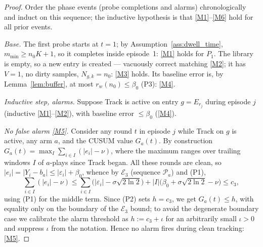 \documentclass[11pt]{article}
\newcommand{\Ecal}{\mathcal E}
\newcommand{\Pcal}{\mathcal P}
\begin{document}
\begin{proof}
Order the phase events (probe completions and alarms) chronologically and induct on this sequence; the inductive hypothesis is that \ref{M1}--\ref{M6} hold for all prior events.

\emph{Base.} The first probe starts at $t=1$; by Assumption~\ref{ass:dwell_time}, $m_{\min}\ge n_0K+1$, so it completes inside episode~1: \ref{M1} holds for $P_1$. The library is empty, so a new entry is created --- vacuously correct matching \ref{M2}; it has $V=1$, no dirty samples, $N_{g,k}=n_0$: \ref{M3} holds. Its baseline error is, by Lemma~\ref{lem:buffer}, at most $r_w(n_0)\le\beta_0$ (P3): \ref{M4}.

\emph{Inductive step, alarms.} Suppose Track is active on entry $g=E_{r_j}$ during episode $j$ (inductive \ref{M1}--\ref{M2}), with baseline error $\le\beta_0$ (\ref{M4}).

\emph{No false alarm \ref{M5}.} Consider any round $t$ in episode $j$ while Track on $g$ is active, any arm $a$, and the CUSUM value $G_a(t)$. By construction $G_a(t)=\max_{I}\sum_{i\in I}(|e_i|-\nu)$, where the maximum ranges over trailing windows $I$ of $a$-plays since Track began. All these rounds are clean, so $|e_i|=|Y_i-b_a|\le|\varepsilon_i|+\beta_0$, whence by $\Ecal_3$ (sequence $\Pcal_a$) and (P1),
\[
\sum_{i\in I}(|e_i|-\nu)
\le\sum_{i\in I}\bigl(|\varepsilon_i|-\sigma\sqrt{2\ln2}\bigr)
+|I|\bigl(\beta_0+\sigma\sqrt{2\ln2}-\nu\bigr)
\le c_3 ,
\]
using (P1) for the middle term. Since (P2) sets $h=c_3$, we get $G_a(t)\le h$, with equality only on the boundary of the $\Ecal_3$ bound; to avoid the degenerate boundary case we calibrate the alarm threshold as $h:=c_3+\iota$ for an arbitrarily small $\iota>0$ and suppress $\iota$ from the notation. Hence no alarm fires during clean tracking: \ref{M5}.


\end{proof}
\end{document}
